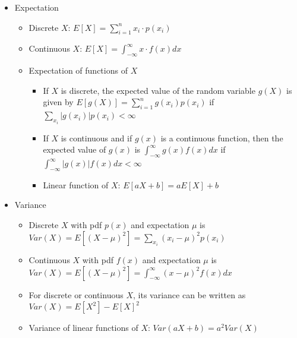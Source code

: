 \documentclass{article}
\begin{document}
\begin{itemize}
\begin{itemize}
        \begin{itemize}
            \item $f(x) \ge 0$ for all $x \in \mathbb{R}$
            \item $\int_{-\infty}^\infty f(x)dx = 1$
        \end{itemize}
        \item Cdf $F(x) = P(X \le x)$
        \begin{itemize}
            \item $F(x) = \int_{-\infty}^x f(x)dx$
            \item $F'(x) = \frac{d}{dx}F(x)=f(x)$
        \end{itemize}
    \end{itemize}
    \item Expectation
    \begin{itemize}
        \item Discrete $X$: $E[X] = \sum_{i=1}^n x_i \cdot p(x_i)$
        \item Continuous $X$: $E[X] = \int_{-\infty}^\infty x \cdot f(x)dx$
        \item Expectation of functions of $X$
        \begin{itemize}
            \item If $X$ is discrete, the expected value of the random variable $g(X)$ is given by $E[g(X)] = \sum_{i=1}^n g(x_i) p(x_i)$ if $\sum_{x_i} \vert g(x_i) \vert p(x_i) < \infty$
            \item If $X$ is continuous and if $g(x)$ is a continuous function, then the expected value of $g(x)$ is $\int_{-\infty}^\infty g(x)f(x)dx$ if $\int_{-\infty}^\infty \vert g(x) \vert f(x) dx < \infty$
            \item Linear function of $X$: $E[aX+b] = aE[X]+b$
        \end{itemize}
    \end{itemize}
    \item Variance
    \begin{itemize}
        \item Discrete $X$ with pdf $p(x)$ and expectation $\mu$ is $Var(X) = E[(X-\mu)^2] = \sum_{x_i} (x_i -\mu)^2 p(x_i)$
        \item Continuous $X$ with pdf $f(x)$ and expectation $\mu$ is $Var(X) = E[(X - \mu)^2] = \int_{-\infty}^\infty (x-\mu)^2f(x)dx$
        \item For discrete or continuous $X$, its variance can be written as $Var(X) = E[X^2] - E[X]^2$
        \item Variance of linear functions of $X$: $Var(aX+b) = a^2Var(X)$
    \end{itemize}

\end{itemize}
\end{document}
